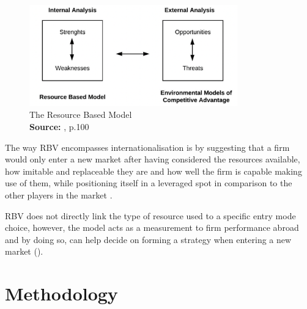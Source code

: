 \documentclass[11pt,a4paper]{article}
\newcommand*{\captionsource}[2]{%
  \caption[{#1}]{%
    #1%
    \\\hspace{\linewidth}%
    \textbf{Source:} #2%
  }%
}
\begin{document}
{{\begin{figure}[H]
	\centering
  \includegraphics[width=90mm]{figures/fig5_rbv_model}
  \vspace{5mm}
    \captionsetup{justification=centering,margin=2cm}
      \captionsource{The Resource Based Model}{\cite{barneyFirmResourcesSustained1991}, p.100}
	\label{fig:rbv_model}
\end{figure}


The way RBV encompasses internationalisation is by suggesting that a firm would only enter a new market after having considered the resources available, how imitable and replaceable they are and how well the firm is capable making use of them, while positioning itself in a leveraged spot in comparison to the other players in the market \parencite{ruzzierResourcebasedApproachInternationalisation2006}.  \par
RBV does not directly link the type of resource used to a specific entry mode choice, however, the model acts as a measurement to firm performance abroad and by doing so, can help decide on forming a strategy when entering a new market (\cite{tulungResourceAvailabilityFirm2017}). 
\newpage


\section{Methodology}
\vspace{-2mm}

}}
\end{document}
